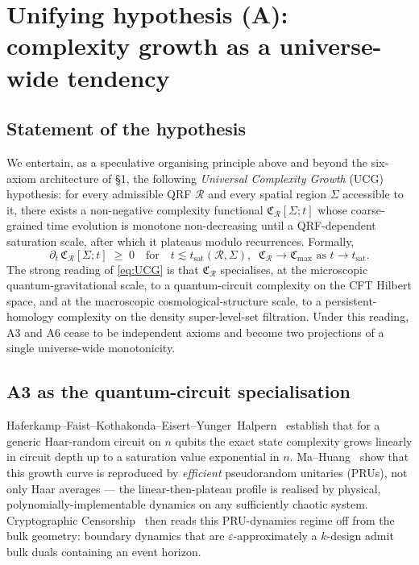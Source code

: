 
\section{Unifying hypothesis (A): complexity growth as a universe-wide tendency}
\label{sec:team_A_unifying}

\subsection*{Statement of the hypothesis}

We entertain, as a speculative organising principle above and beyond the
six-axiom architecture of \S1, the following \emph{Universal Complexity
Growth} (UCG) hypothesis: for every admissible QRF $\mathcal{R}$ and every
spatial region $\Sigma$ accessible to it, there exists a non-negative
complexity functional $\mathfrak{C}_{\mathcal{R}}[\Sigma; t]$ whose
coarse-grained time evolution is monotone non-decreasing until a
QRF-dependent saturation scale, after which it plateaus modulo
recurrences. Formally,
\begin{equation}
\boxed{\;
\partial_t \, \mathfrak{C}_{\mathcal{R}}[\Sigma;t]
\;\geq\; 0
\quad\text{for}\quad t \lesssim t_{\mathrm{sat}}(\mathcal{R},\Sigma),
\;\;
\mathfrak{C}_{\mathcal{R}} \to \mathfrak{C}_{\max}
\text{ as } t\to t_{\mathrm{sat}}.
\;}
\label{eq:UCG}
\end{equation}
The strong reading of \eqref{eq:UCG} is that $\mathfrak{C}_{\mathcal{R}}$
specialises, at the microscopic quantum-gravitational scale, to a
quantum-circuit complexity on the CFT Hilbert space, and at the
macroscopic cosmological-structure scale, to a persistent-homology
complexity on the density super-level-set filtration. Under this reading,
A3 and A6 cease to be independent axioms and become two projections of a
single universe-wide monotonicity.

\subsection*{A3 as the quantum-circuit specialisation}

Haferkamp--Faist--Kothakonda--Eisert--Yunger~Halpern~\cite{Haferkamp2022}
establish that for a generic Haar-random circuit on $n$ qubits the exact
state complexity grows linearly in circuit depth up to a saturation
value exponential in $n$. Ma--Huang~\cite{MaHuang2025} show that this
growth curve is reproduced by \emph{efficient} pseudorandom unitaries
(PRUs), not only Haar averages --- the linear-then-plateau profile is
realised by physical, polynomially-implementable dynamics on any
sufficiently chaotic system. Cryptographic
Censorship~\cite{CryptoCensorship} then reads this PRU-dynamics regime
off from the bulk geometry: boundary dynamics that are
$\varepsilon$-approximately a $k$-design admit bulk duals containing an
event horizon.

